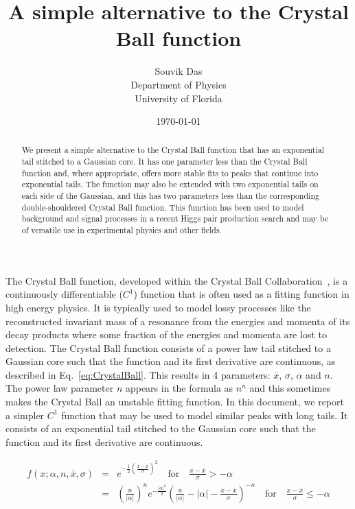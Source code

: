 \documentclass[10pt,letterpaper]{article}
\begin{document}
\title{A simple alternative to the Crystal Ball function}
\date{\today}
\author{Souvik Das\\ Department of Physics \\ University of Florida}
\maketitle

\begin{abstract}
We present a simple alternative to the Crystal Ball function that has an exponential tail stitched to a Gaussian core. It has one parameter less than the Crystal Ball function and, where appropriate, offers more stable fits to peaks that continue into exponential tails. The function may also be extended with two exponential tails on each side of the Gaussian, and this has two parameters less than the corresponding double-shouldered Crystal Ball function. This function has been used to model background and signal processes in a recent Higgs pair production search and may be of versatile use in experimental physics and other fields.
\end{abstract}

\bigskip

The Crystal Ball function, developed within the Crystal Ball Collaboration~\cite{Oreglia:1980cs, Skwarnicki:1986xj}, is a continuously differentiable ($C^1$) function that is often used as a fitting function in high energy physics. It is typically used to model lossy processes like the reconstructed invariant mass of a resonance from the energies and momenta of its decay products where some fraction of the energies and momenta are lost to detection. The Crystal Ball function consists of a power law tail stitched to a Gaussian core such that the function and its first derivative are continuous, as described in Eq.~\ref{eq:CrystalBall}. This results in 4 parameters: $\bar{x}$, $\sigma$, $\alpha$ and $n$. The power law parameter $n$ appears in the formula as $n^n$ and this sometimes makes the Crystal Ball an unstable fitting function. In this document, we report a simpler $C^1$ function that may be used to model similar peaks with long tails. It consists of an exponential tail stitched to the Gaussian core such that the function and its first derivative are continuous.

\begin{eqnarray}
\label{eq:CrystalBall}
f(x; \alpha, n, \bar{x}, \sigma) &=& e^{-\frac{1}{2}\left({\frac{x-\bar{x}}{\sigma}}\right)^2} \quad \textrm{for} \quad \frac{x-\bar{x}}{\sigma} > -\alpha \\
                                 &=& \left(\frac{n}{|\alpha|}\right)^n e^{-\frac{|\alpha|^2}{2}} \left( \frac{n}{|\alpha|} - |\alpha| - \frac{x-\bar{x}}{\sigma} \right)^{-n} \quad \textrm{for} \quad \frac{x-\bar{x}}{\sigma} \leq -\alpha \nonumber
\end{eqnarray} \\
\end{document}
